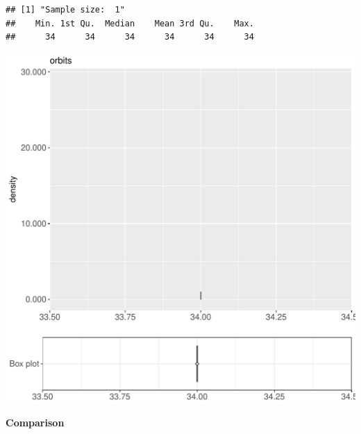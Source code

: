 \documentclass{article}\usepackage[]{graphicx}\usepackage[]{color}
\makeatletter
\def\maxwidth{ %
  \ifdim\Gin@nat@width>\linewidth
    \linewidth
  \else
    \Gin@nat@width
  \fi
}
\newenvironment{kframe}{%
 \def\at@end@of@kframe{}%
 \ifinner\ifhmode%
  \def\at@end@of@kframe{\end{minipage}}%
  \begin{minipage}{\columnwidth}%
 \fi\fi%
 \def\FrameCommand##1{\hskip\@totalleftmargin \hskip-\fboxsep
 \colorbox{shadecolor}{##1}\hskip-\fboxsep
     \hskip-\linewidth \hskip-\@totalleftmargin \hskip\columnwidth}%
 \MakeFramed {\advance\hsize-\width
   \@totalleftmargin\z@ \linewidth\hsize
   \@setminipage}}%
 {\par\unskip\endMakeFramed%
 \at@end@of@kframe}
\newenvironment{knitrout}{}{} %
\makeatother
\begin{document}
\begin{knitrout}
\color{fgcolor}\begin{kframe}
\begin{verbatim}
## [1] "Sample size:  1"
##    Min. 1st Qu.  Median    Mean 3rd Qu.    Max. 
##      34      34      34      34      34      34
\end{verbatim}


{\ttfamily\noindent\bfseries{}}\end{kframe}
\includegraphics[width=\maxwidth]{figure/RH6_cashewExceptReduce_big-1} 

\end{knitrout}
  
 \textbf{Comparison}
  
\end{document}
